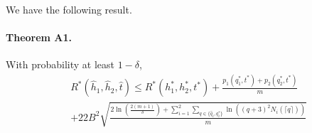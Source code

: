 \documentclass{article}
\newcommand{\pen}[0]{p}
\begin{document}
We have the following result.

\paragraph{Theorem A1.} With probability at least $1-\delta$, 
\begin{align*}
& R^{*}(\hat{h}_{1},\hat{h}_{2},\hat{t}) \leq R^{*}(h_{1}^{*},h_{2}^{*},t^{*}) + \frac{\pen_{1}(q_{1}^{*},t^{*}) + \pen_{2}(q_{2}^{*},t^{*})}{m} 
\\ & + 22 B^{2} \sqrt{\frac{2 \ln(\frac{2(m+1)}{\delta}) \!+\! \sum_{i=1}^{2} \sum_{q \in \{\hat{q}_{i},q_{i}^{*}\}} \!\ln\!\left( (q\!+\!3)^{2} N_{i}(\lceil q \rceil) \right)}{m}}
\end{align*}
\end{document}
